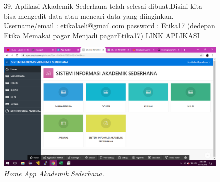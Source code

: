 \begin{enumerate}
\begin{figure}
\item[39.]Aplikasi Akademik Sederhana telah selesai dibuat.Disini kita bisa mengedit data atau mencari data yang diinginkan.
Username/email : etikalaeli@gmail.com
password : Etika17 (dedepan Etika Memakai pagar Menjadi pagarEtika17)
\href{https://apex.oracle.com/pls/apex/f?p=101498:7:107880375171823::NO:::}{LINK APLIKASI}
    \begin{center}
    \includegraphics[scale=0.3]{figures/66.png}
    \caption{\textit{Home App Akademik Sederhana.}}
    \end{center}
    \label{gambar}
    \end{figure}   

\end{enumerate}
